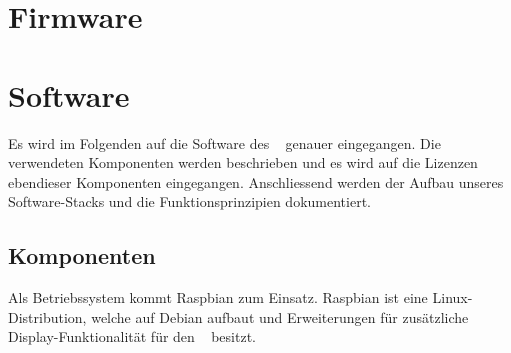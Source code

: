 {\begin{a3pages}
{\begin{minipage}{115mm}
    \vspace*{40mm}

    \hfill{}
\end{minipage}}
\hspace*{15mm}
\end{a3pages}}


\section{Firmware \Sensor}
\label{sec:firmware:sensor}



\section{Software \Master}
\label{sec:software:master}

Es wird  im Folgenden auf  die Software des \Master~  genauer eingegangen. Die
verwendeten  Komponenten  werden beschrieben  und  es  wird auf  die  Lizenzen
ebendieser  Komponenten eingegangen. Anschliessend  werden der  Aufbau unseres
Software-Stacks und die Funktionsprinzipien dokumentiert.


\subsection{Komponenten}
\label{subsec:software:master:components}

Als   Betriebssystem   kommt   Raspbian   zum   Einsatz. Raspbian   ist   eine
Linux-Distribution,  welche auf  Debian   aufbaut  und
Erweiterungen f\"ur  zus\"atzliche Display-Funktionalit\"at f\"ur  den \Raspi~
besitzt.

